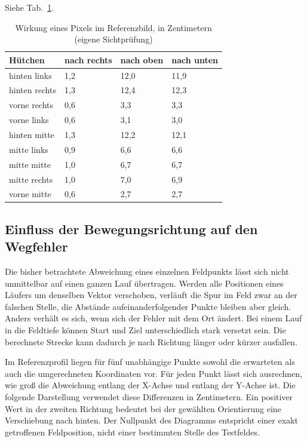Siehe Tab.~\ref{tab:em-pixel}.
\begin{table}[htbp]\centering\caption{Wirkung eines Pixels im Referenzbild, in Zentimetern (eigene Sichtprüfung)}\label{tab:em-pixel}
\begin{tabular}{@{}llll@{}}\toprule Hütchen & nach rechts & nach oben & nach unten\\\midrule
hinten links & 1,2 & 12,0 & 11,9\\
hinten rechts & 1,3 & 12,4 & 12,3\\
vorne rechts & 0,6 & 3,3 & 3,3\\
vorne links & 0,6 & 3,1 & 3,0\\
hinten mitte & 1,3 & 12,2 & 12,1\\
mitte links & 0,9 & 6,6 & 6,6\\
mitte mitte & 1,0 & 6,7 & 6,7\\
mitte rechts & 1,0 & 7,0 & 6,9\\
vorne mitte & 0,6 & 2,7 & 2,7\\\bottomrule\end{tabular}\end{table}


\subsection{Einfluss der Bewegungsrichtung auf den Wegfehler}
Die bisher betrachtete Abweichung eines einzelnen Feldpunkts lässt sich nicht unmittelbar auf einen ganzen Lauf übertragen. Werden alle Positionen eines Läufers um denselben Vektor verschoben, verläuft die Spur im Feld zwar an der falschen Stelle, die Abstände aufeinanderfolgender Punkte bleiben aber gleich. Anders verhält es sich, wenn sich der Fehler mit dem Ort ändert. Bei einem Lauf in die Feldtiefe können Start und Ziel unterschiedlich stark versetzt sein. Die berechnete Strecke kann dadurch je nach Richtung länger oder kürzer ausfallen.

Im Referenzprofil liegen für fünf unabhängige Punkte sowohl die erwarteten als auch die umgerechneten Koordinaten vor. Für jeden Punkt lässt sich ausrechnen, wie groß die Abweichung entlang der X-Achse und entlang der Y-Achse ist. Die folgende Darstellung verwendet diese Differenzen in Zentimetern. Ein positiver Wert in der zweiten Richtung bedeutet bei der gewählten Orientierung eine Verschiebung nach hinten. Der Nullpunkt des Diagramms entspricht einer exakt getroffenen Feldposition, nicht einer bestimmten Stelle des Testfeldes.

